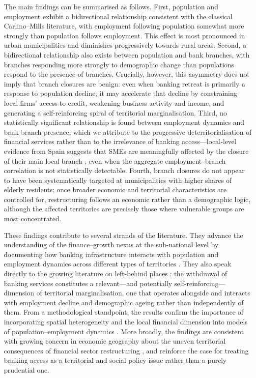\documentclass[a4paper,11pt,oneside]{article}
\begin{document}
{The main findings can be summarised as follows. First, population and employment exhibit a bidirectional relationship consistent with the classical Carlino--Mills literature, with employment following population somewhat more strongly than population follows employment. This effect is most pronounced in urban municipalities and diminishes progressively towards rural areas. Second, a bidirectional relationship also exists between population and bank branches, with branches responding more strongly to demographic change than populations respond to the presence of branches. Crucially, however, this asymmetry does not imply that branch closures are benign: even when banking retreat is primarily a response to population decline, it may accelerate that decline by constraining local firms' access to credit, weakening business activity and income, and generating a self-reinforcing spiral of territorial marginalisation. Third, no statistically significant relationship is found between employment dynamics and bank branch presence, which we attribute to the progressive deterritorialisation of financial services rather than to the irrelevance of banking access---local-level evidence from Spain suggests that SMEs are meaningfully affected by the closure of their main local branch \citep{jimenez2022bank}, even when the aggregate employment--branch correlation is not statistically detectable. Fourth, branch closures do not appear to have been systematically targeted at municipalities with higher shares of elderly residents; once broader economic and territorial characteristics are controlled for, restructuring follows an economic rather than a demographic logic, although the affected territories are precisely those where vulnerable groups are most concentrated.

These findings contribute to several strands of the literature. They advance the understanding of the finance--growth nexus at the sub-national level by documenting how banking infrastructure interacts with population and employment dynamics across different types of territories \citep{alama2025spatio}. They also speak directly to the growing literature on left-behind places \citep{rodriguez2018revenge,cowling2024getting}: the withdrawal of banking services constitutes a relevant---and potentially self-reinforcing---dimension of territorial marginalisation, one that operates alongside and interacts with employment decline and demographic ageing rather than independently of them. From a methodological standpoint, the results confirm the importance of incorporating spatial heterogeneity and the local financial dimension into models of population--employment dynamics \citep{alama2021drivers,alama2025spatio}. More broadly, the findings are consistent with growing concern in economic geography about the uneven territorial consequences of financial sector restructuring \citep{sokol2017financialisation,wojcik2021financial}, and reinforce the case for treating banking access as a territorial and social policy issue rather than a purely prudential one.

}
\end{document}
